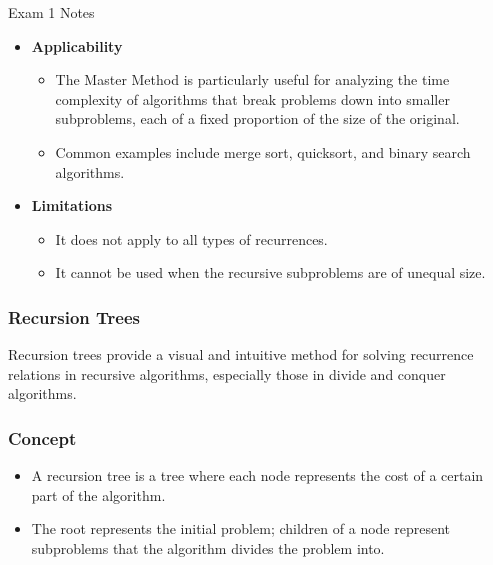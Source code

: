 \begin{examnotes}{Exam 1 Notes}
    \begin{itemize}
        \item \textbf{Applicability}
        \begin{itemize}
            \item The Master Method is particularly useful for analyzing the time complexity of algorithms that break problems down into smaller subproblems, each of a fixed proportion of the size 
            of the original.
            \item Common examples include merge sort, quicksort, and binary search algorithms.
        \end{itemize}
        \item \textbf{Limitations}
        \begin{itemize}
            \item It does not apply to all types of recurrences.
            \item It cannot be used when the recursive subproblems are of unequal size.
        \end{itemize}
    \end{itemize}

    \subsubsection*{Recursion Trees}

    Recursion trees provide a visual and intuitive method for solving recurrence relations in recursive algorithms, especially those in divide and conquer algorithms.

    \subsubsection*{Concept}

    \begin{itemize}
        \item A recursion tree is a tree where each node represents the cost of a certain part of the algorithm.
        \item The root represents the initial problem; children of a node represent subproblems that the algorithm divides the problem into.
    \end{itemize}


\end{examnotes}
